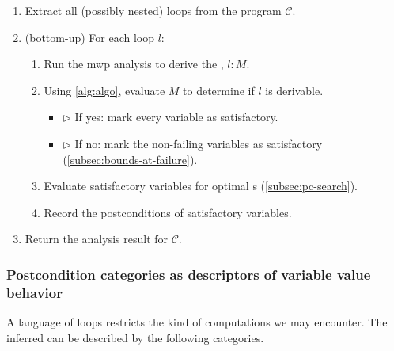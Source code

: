 \begin{enumerate}
\item Extract all (possibly nested) loops from the
program \(\mathcal{C}\).
\item (bottom-up) For each loop \(l\):
\begin{enumerate}[label=(\roman*)]
\item Run the mwp analysis to derive the , \(l :
M\).
\item Using \autoref{alg:algo}, evaluate \(M\) to determine if
\(l\) is derivable.
\begin{itemize}
    \item[] \(\triangleright\) If yes: mark every variable as satisfactory.
    \item[] \(\triangleright\) If no: mark the non-failing variables as
    satisfactory (\autoref{subsec:bounds-at-failure}).
\end{itemize}
\item Evaluate satisfactory variables for optimal s
(\autoref{subsec:pc-search}).
\item Record the postconditions of satisfactory variables.
\end{enumerate}
\item Return the analysis result for \(\mathcal{C}\).
\end{enumerate}

\subsubsection{Postcondition categories as descriptors of variable value
behavior}
\label{subsec:disclaimer}

A language of loops restricts the kind of computations we may encounter. The
inferred  can be described by the following categories.


